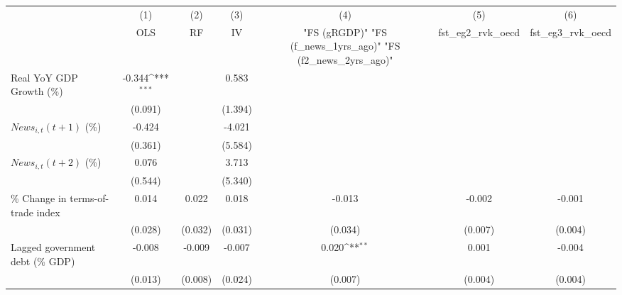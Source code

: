 {
\def\sym#1{\ifmmode^{#1}\else\(^{#1}\)\fi}
\begin{tabular}{l*{6}{c}}
\toprule
                    &\multicolumn{1}{c}{(1)}&\multicolumn{1}{c}{(2)}&\multicolumn{1}{c}{(3)}&\multicolumn{1}{c}{(4)}&\multicolumn{1}{c}{(5)}&\multicolumn{1}{c}{(6)}\\
                    &\multicolumn{1}{c}{OLS}&\multicolumn{1}{c}{RF}&\multicolumn{1}{c}{IV}&\multicolumn{1}{c}{ "FS (gRGDP)"  "FS (f_news_1yrs_ago)"  "FS (f2_news_2yrs_ago)" }&\multicolumn{1}{c}{fst_eg2_rvk_oecd}&\multicolumn{1}{c}{fst_eg3_rvk_oecd}\\
\midrule
Real YoY GDP Growth (\%)&      -0.344\sym{***}&                     &       0.583         &                     &                     &                     \\
                    &     (0.091)         &                     &     (1.394)         &                     &                     &                     \\
\addlinespace
$ News_{i,t}(t+1)$ (\%)&      -0.424         &                     &      -4.021         &                     &                     &                     \\
                    &     (0.361)         &                     &     (5.584)         &                     &                     &                     \\
\addlinespace
$ News_{i,t}(t+2)$ (\%)&       0.076         &                     &       3.713         &                     &                     &                     \\
                    &     (0.544)         &                     &     (5.340)         &                     &                     &                     \\
\addlinespace
\% Change in terms-of-trade index&       0.014         &       0.022         &       0.018         &      -0.013         &      -0.002         &      -0.001         \\
                    &     (0.028)         &     (0.032)         &     (0.031)         &     (0.034)         &     (0.007)         &     (0.004)         \\
\addlinespace
Lagged government debt (\% GDP)&      -0.008         &      -0.009         &      -0.007         &       0.020\sym{**} &       0.001         &      -0.004         \\
                    &     (0.013)         &     (0.008)         &     (0.024)         &     (0.007)         &     (0.004)         &     (0.004)         \\

\end{tabular}}
